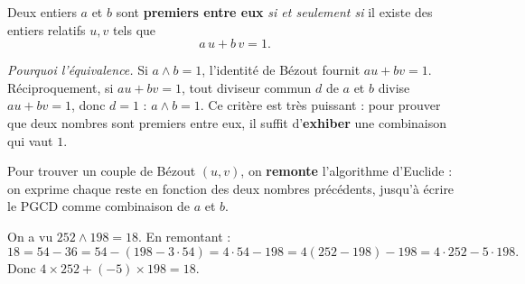 \begin{theoreme}
Deux entiers $a$ et $b$ sont \textbf{premiers entre eux} \emph{si et seulement si} il existe
des entiers relatifs $u,v$ tels que
\[
a\,u+b\,v=1.
\]
\end{theoreme}

\begin{remarque}
\textit{Pourquoi l'équivalence.} Si $a\wedge b=1$, l'identité de Bézout fournit
$au+bv=1$. Réciproquement, si $au+bv=1$, tout diviseur commun $d$ de $a$ et $b$ divise
$au+bv=1$, donc $d=1$ : $a\wedge b=1$. Ce critère est très puissant : pour prouver que deux
nombres sont premiers entre eux, il suffit d'\textbf{exhiber} une combinaison qui vaut $1$.
\end{remarque}

\begin{aretenir}
Pour trouver un couple de Bézout $(u,v)$, on \textbf{remonte} l'algorithme d'Euclide : on
exprime chaque reste en fonction des deux nombres précédents, jusqu'à écrire le PGCD comme
combinaison de $a$ et $b$.
\end{aretenir}

\begin{exemple}
On a vu $252\wedge198=18$. En remontant :
\[
18=54-36=54-(198-3\cdot54)=4\cdot54-198=4(252-198)-198=4\cdot252-5\cdot198.
\]
Donc $\boxed{4\times252+(-5)\times198=18}$.
\end{exemple}

\begin{illus}
\end{illus}

